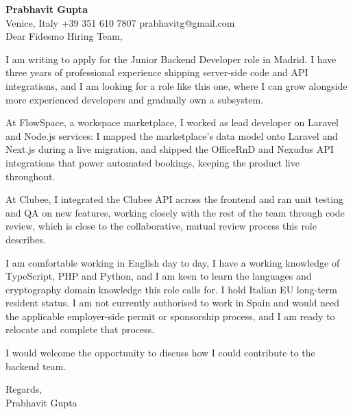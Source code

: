 \documentclass[a4paper,10.5pt]{article}
\begin{document}
\textbf{Prabhavit Gupta}\\
Venice, Italy \textbar{} +39 351 610 7807 \textbar{} prabhavitg@gmail.com\\[10pt]
Dear Fidesmo Hiring Team,

I am writing to apply for the Junior Backend Developer role in Madrid. I have three years of professional experience shipping server-side code and API integrations, and I am looking for a role like this one, where I can grow alongside more experienced developers and gradually own a subsystem.

At FlowSpace, a workspace marketplace, I worked as lead developer on Laravel and Node.js services: I mapped the marketplace's data model onto Laravel and Next.js during a live migration, and shipped the OfficeRnD and Nexudus API integrations that power automated bookings, keeping the product live throughout.

At Clubee, I integrated the Clubee API across the frontend and ran unit testing and QA on new features, working closely with the rest of the team through code review, which is close to the collaborative, mutual review process this role describes.

I am comfortable working in English day to day, I have a working knowledge of TypeScript, PHP and Python, and I am keen to learn the languages and cryptography domain knowledge this role calls for. I hold Italian EU long-term resident status. I am not currently authorised to work in Spain and would need the applicable employer-side permit or sponsorship process, and I am ready to relocate and complete that process.

I would welcome the opportunity to discuss how I could contribute to the backend team.

Regards,\\
Prabhavit Gupta
\end{document}
